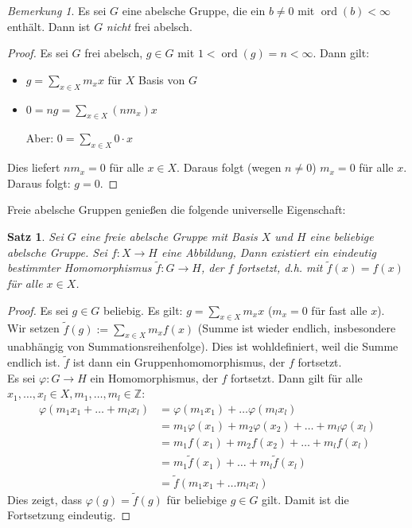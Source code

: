 \documentclass[12pt]{scrartcl} %
\newtheorem{thm}{Satz}
\theoremstyle{definition}
\theoremstyle{remark}
\newtheorem*{nb}{Bemerkung}
\begin{document}
\begin{nb}
  Es sei $G$ eine abelsche Gruppe, die ein $b \neq 0 $ mit $\operatorname{ord}(b) < \infty$ enthält. Dann ist $G$ \emph{nicht} frei abelsch.
\end{nb}

\begin{proof}
  Es sei $G$ frei abelsch, $g \in G$ mit $ 1 < \operatorname{ord}(g) = n < \infty$. Dann gilt:
  \begin{itemize}
    \item $g = \sum_{x \in X} m_x x $ für $X$ Basis von $G$ 
    \item $0 = ng = \sum_{x \in X} (n m_x) x $
    \item[Aber:] $0 = \sum_{x \in X} 0 \cdot x$
  \end{itemize}
  Dies liefert $n m_x = 0$ für alle $x \in X$. Daraus folgt (wegen $n \neq 0$) $m_x = 0$ für alle $x$. Daraus folgt: $g = 0$.
\end{proof}

Freie abelsche Gruppen genießen die folgende universelle Eigenschaft:  

\begin{thm}
  Sei $G$ eine freie abelsche Gruppe mit Basis $X$ und $H$ eine beliebige abelsche Gruppe. Sei $f : X \to H$ eine Abbildung, Dann existiert ein eindeutig bestimmter Homomorphismus $\tilde{f}: G \to H$, der $f$ fortsetzt, d.h. mit $\tilde{f}(x) = f(x)$ für alle $x \in X$.
\end{thm}
\begin{proof}
  Es sei $g \in G$ beliebig. Es gilt: $g = \sum_{x \in X}m_x x$ ($ m_x = 0$ für fast alle $x$). \\
  Wir setzen $\tilde{f}(g) := \sum_{x \in X} m_x f(x)$ (Summe ist wieder endlich, insbesondere unabhängig von Summationsreihenfolge). Dies ist wohldefiniert, weil die Summe endlich ist. $\tilde{f}$ ist dann ein Gruppenhomomorphismus, der $f$ fortsetzt.  \\
  Es sei $\varphi : G \to H$ ein Homomorphismus, der $f$ fortsetzt. Dann gilt für alle $x_1,\dots,x_l \in X, m_1,\dots,m_l \in \mathbb{Z}$: 
  \begin{align*}
  \varphi(m_1 x_1 + \dots + m_l x_l) 
  &= \varphi( m_1 x_1) + \dots \varphi( m_l x_l ) \\
  &= m_1 \varphi(x_1) + m_2 \varphi(x_2) + \dots + m_l \varphi(x_l) \\
  &= m_1 f(x_1) + m_2 f(x_2) + \dots + m_l f(x_l) \\
  &= m_1 \tilde{f}(x_1) + \dots + m_l \tilde{f}(x_l)\\
  &= \tilde{f}( m_1 x_1 + \dots m_l x_l)
  \end{align*}
  Dies zeigt, dass $\varphi(g) = \tilde{f}(g) $ für beliebige $g \in G$ gilt. Damit ist die Fortsetzung eindeutig.
\end{proof} 
\end{document}
